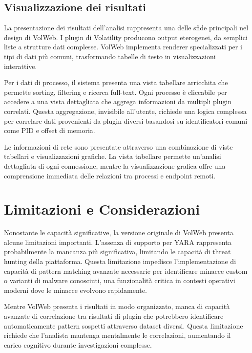 \subsection{Visualizzazione dei risultati}

La presentazione dei risultati dell'analisi rappresenta una delle sfide principali nel design di VolWeb. I plugin di Volatility producono output eterogenei, da semplici liste a strutture dati complesse. VolWeb implementa renderer specializzati per i tipi di dati più comuni, trasformando tabelle di testo in visualizzazioni interattive.

Per i dati di processo, il sistema presenta una vista tabellare arricchita che permette sorting, filtering e ricerca full-text. Ogni processo è cliccabile per accedere a una vista dettagliata che aggrega informazioni da multipli plugin correlati. Questa aggregazione, invisibile all'utente, richiede una logica complessa per correlare dati provenienti da plugin diversi basandosi su identificatori comuni come PID e offset di memoria.

Le informazioni di rete sono presentate attraverso una combinazione di viste tabellari e visualizzazioni grafiche. La vista tabellare permette un'analisi dettagliata di ogni connessione, mentre la visualizzazione grafica offre una comprensione immediata delle relazioni tra processi e endpoint remoti.

\section{Limitazioni e Considerazioni}

Nonostante le capacità significative, la versione originale di VolWeb presenta alcune limitazioni importanti. L'assenza di supporto per YARA rappresenta probabilmente la mancanza più significativa, limitando le capacità di threat hunting della piattaforma. Questa limitazione impedisce l'implementazione di capacità di pattern matching avanzate necessarie per identificare minacce custom o varianti di malware conosciuti, una funzionalità critica in contesti operativi moderni dove le minacce evolvono rapidamente.

Mentre VolWeb presenta i risultati in modo organizzato, manca di capacità avanzate di correlazione tra risultati di plugin che potrebbero identificare automaticamente pattern sospetti attraverso dataset diversi. Questa limitazione richiede che l'analista mantenga mentalmente le correlazioni, aumentando il carico cognitivo durante investigazioni complesse.

